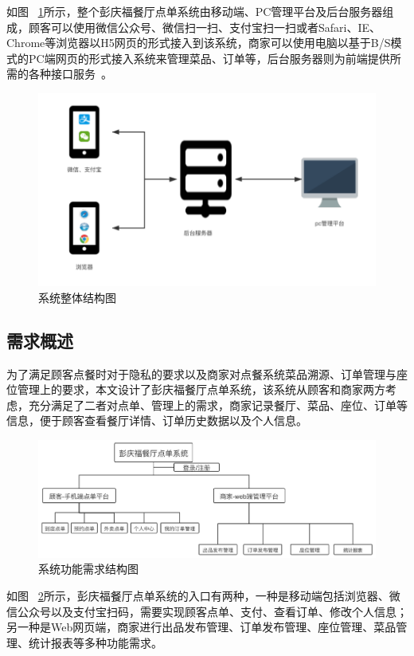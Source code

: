 如图
~\ref{fig_strucCH3}所示，整个彭庆福餐厅点单系统由移动端、PC管理平台及后台服务器组成，顾客可以使用微信公众号、微信扫一扫、支付宝扫一扫或者Safari、IE、Chrome等浏览器以H5网页的形式接入到该系统，商家可以使用电脑以基于B/S模式的PC端网页的形式接入系统来管理菜品、订单等，后台服务器则为前端提供所需的各种接口服务~\cite{yamamoto1999raw}。
\begin{figure}[htbp!]
    \centering
    \includegraphics[width=5in]{FIGs/chapter3/struc.pdf}
    \caption{系统整体结构图}\label{fig_strucCH3}
\end{figure}

\subsection{需求概述}
为了满足顾客点餐时对于隐私的要求以及商家对点餐系统菜品溯源、订单管理与座位管理上的要求，本文设计了彭庆福餐厅点单系统，该系统从顾客和商家两方考虑，充分满足了二者对点单、管理上的需求，商家记录餐厅、菜品、座位、订单等信息，便于顾客查看餐厅详情、订单历史数据以及个人信息。
\begin{figure}[htbp!]
    \centering
    \includegraphics[width=5in]{FIGs/chapter3/function.pdf}
    \caption{系统功能需求结构图}\label{fig_functionCH3}
\end{figure}

如图
~\ref{fig_functionCH3}所示，彭庆福餐厅点单系统的入口有两种，一种是移动端包括浏览器、微信公众号以及支付宝扫码，需要实现顾客点单、支付、查看订单、修改个人信息；另一种是Web网页端，商家进行出品发布管理、订单发布管理、座位管理、菜品管理、统计报表等多种功能需求。

